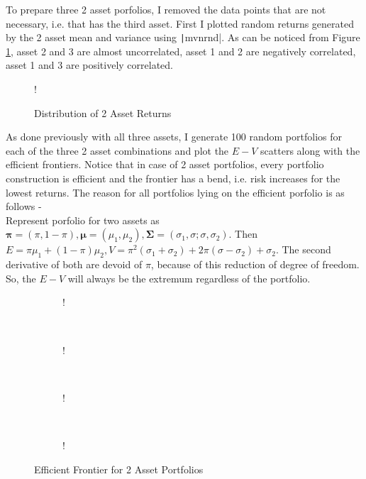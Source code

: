 \documentclass[11pt]{article}
\begin{document}
To prepare three 2 asset porfolios, I removed the data points that are not necessary, i.e. that has
the third asset. First I plotted random returns generated by the 2 asset mean and variance using
\texttt|mvnrnd|. As can be noticed from Figure \ref{fig:q1-b-return-distribution}, asset
2 and 3 are almost uncorrelated, asset 1 and 2 are negatively correlated, asset 1 and 3 are positively
correlated.\\

\begin{figure}[!h]
	\vspace{-0.5cm}
	\centering 
	 {!} { }
	\caption{Distribution of 2 Asset Returns}
	\label{fig:q1-b-return-distribution}
	\vspace{-0.5cm}
\end{figure}

As done previously with all three assets, I generate 100 random portfolios for each of the three 2 asset
combinations and plot the $E-V$ scatters along with the efficient frontiers. Notice that in case of 2 asset portfolios, every portfolio construction is efficient and the frontier
has a bend, i.e. risk increases for the lowest returns. The reason for all portfolios lying on the efficient porfolio
is as follows - \\

Represent porfolio for two assets as $\bm{\pi} = (\pi, 1-\pi), \bm{\mu} = (\mu_1, \mu_2), \bm{\Sigma}=(\sigma_1, \sigma; \sigma, \sigma_2)$.
Then $E = \pi\mu_1 + (1-\pi)\mu_2, V = \pi^2(\sigma_1 + \sigma_2) +2\pi(\sigma - \sigma_2) + \sigma_2$. The second derivative
of both are devoid of $\pi$, because of this reduction of degree of freedom. So, the $E-V$ will always be the extremum
regardless of the portfolio.

\begin{figure}[!h]
   \centering 
   \begin{subfigure}[b]{0.23\textwidth}
     	\resizebox {\textwidth} {!} { }
		\label{fig:q1-b-efficient-frontier-1}
    \end{subfigure}
    ~
    \begin{subfigure}[b]{0.23\textwidth}
       	\resizebox {\textwidth} {!} { }
        \label{fig:q1-b-efficient-frontier-2}
    \end{subfigure}
	~
    \begin{subfigure}[b]{0.23\textwidth}
       	\resizebox {\textwidth} {!} { }
        \label{fig:q1-b-efficient-frontier-3}
    \end{subfigure}
	~
    \begin{subfigure}[b]{0.23\textwidth}
       	\resizebox {\textwidth} {!} { }
        \label{fig:q1-b-efficient-frontier-all}
    \end{subfigure}
	\vspace{-0.5cm}
    \caption{Efficient Frontier for 2 Asset Portfolios}\label{fig:naive_v_cvx}
\end{figure}
\end{document}
